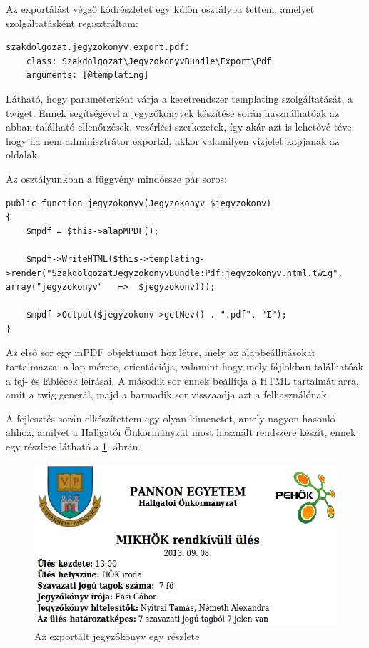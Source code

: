 \documentclass[a4paper,12pt,oneside]{report}
\begin{document}
Az exportálást végző kódrészletet egy külön osztályba tettem, amelyet szolgáltatásként regisztráltam:

\begin{lstlisting}
szakdolgozat.jegyzokonyv.export.pdf:
    class: Szakdolgozat\JegyzokonyvBundle\Export\Pdf
    arguments: [@templating]
\end{lstlisting}

Látható, hogy paraméterként várja a keretrendszer templating szolgáltatását, a twiget. Ennek segítségével a jegyzőkönyvek készítése során használhatóak az abban található ellenőrzések, vezérlési szerkezetek, így akár azt is lehetővé téve, hogy ha nem adminisztrátor exportál, akkor valamilyen vízjelet kapjanak az oldalak.

Az osztályunkban a függvény mindössze pár soros:

\begin{lstlisting}
public function jegyzokonyv(Jegyzokonyv $jegyzokonv)
{
    $mpdf = $this->alapMPDF();

    $mpdf->WriteHTML($this->templating->render("SzakdolgozatJegyzokonyvBundle:Pdf:jegyzokonyv.html.twig", array("jegyzokonyv"   =>  $jegyzokonv)));

    $mpdf->Output($jegyzokonv->getNev() . ".pdf", "I");
}
\end{lstlisting}

Az első sor egy mPDF objektumot hoz létre, mely az alapbeállításokat tartalmazza: a lap mérete, orientációja, valamint hogy mely fájlokban találhatóak a fej- és láblécek leírásai. A második sor ennek beállítja a HTML tartalmát arra, amit a twig generál, majd a harmadik sor visszaadja azt a felhasználónak.

A fejlesztés során elkészítettem egy olyan kimenetet, amely nagyon hasonló ahhoz, amilyet a Hallgatói Önkormányzat most használt rendszere készít, ennek egy részlete látható a \ref{fig:jegyzokonyv_export}. ábrán.

\begin{figure}[h]
    \centering
    \includegraphics[width=\textwidth]{jegyzokonyv_export.png}
    \caption{Az exportált jegyzőkönyv egy részlete}
    \label{fig:jegyzokonyv_export}
\end{figure}
\end{document}
